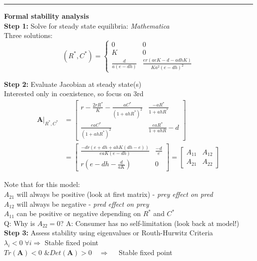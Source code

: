 \documentclass{article}
\newcommand{\note}[1]{\colorbox{gray!30}{#1}}
\newcommand{\ind}{\-\hspace{1cm}}
\begin{document}
\rule[0.5ex]{\linewidth}{1pt}

\pagebreak

\textbf{Formal stability analysis}\\
\textbf{Step 1:} Solve for steady state equilibria: \note{\emph{Mathematica}}\\
\ind Three solutions:
\begin{equation*}
	(R^*,C^*)=\begin{cases}
	0 & 0\\
	K & 0\\
	\frac{d}{a(e-dh)} & \frac{er(aeK-d-adhK)}{Ka^2(e-dh)^2}
	\end{cases}
\end{equation*}

\textbf{Step 2:} Evaluate Jacobian at steady state(s)\\
\ind Interested only in coexistence, so focus on 3rd
\begin{align*}
	\left.\mathbf{A}\right\vert_{R^*,C^*} 
	&= \begin{bmatrix}r-\frac{2rR^*}{K} - \frac{aC^*}{(1+ahR^*)^2} & \frac{-aR^*}{1+ahR^*}\\
				\frac{eaC^*}{(1+ahR^*)^2} & \frac{eaR^*}{1+ahR}-d \end{bmatrix}\\
	&=\begin{bmatrix} \frac{-dr(e+dh+ahK(dh-e))}{eaK(e-dh)} & \frac{-d}{e}\\
	r\left(e-dh-\frac{d}{aK}\right) & 0 \end{bmatrix}	
	=\begin{bmatrix} A_{11} & A_{12} \\ A_{21}& A_{22}	\end{bmatrix}	
\end{align*}

Note that for this model:\\
\ind $A_{21}$ will always be positive (look at first matrix) - \emph{prey effect on pred}\\
\ind $A_{12}$ will always be negative - \emph{pred effect on prey}\\
\ind $A_{11}$ can be positive or negative depending on $R^*$ and $C^*$\\
\note{Q:} Why is $A_{22}=0$?  \note{A:} Consumer has no self-limitation (look back at model!)\\

\textbf{Step 3:} Assess stability using eigenvalues or Routh-Hurwitz Criteria\\
\ind $\lambda_i <0 \; \forall i \Rightarrow $ Stable fixed point\\
\ind $Tr(\mathbf{A}) < 0 \text{ \& } Det(\mathbf{A})>0 \quad \Rightarrow \quad $ Stable fixed point\\
\end{document}
